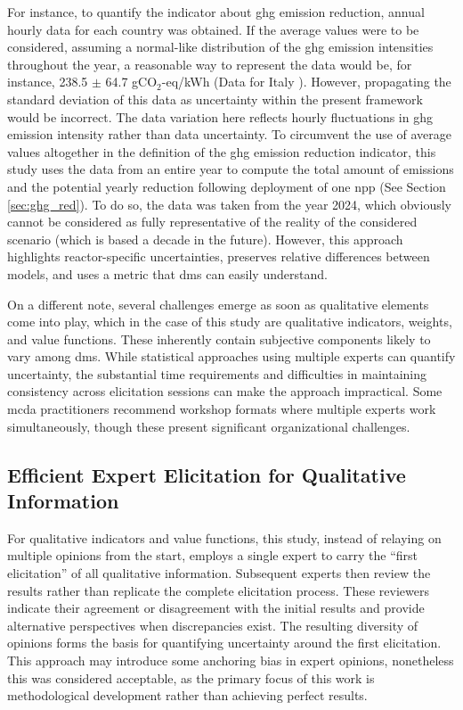 For instance, to quantify the indicator about \gls{ghg} emission reduction, annual hourly data for each country was obtained. If the average values were to be considered, assuming a normal-like distribution of the \gls{ghg} emission intensities throughout the year, a reasonable way to represent the data would be, for instance, 238.5 $\pm$ 64.7 gCO$_2$-eq/kWh (Data for Italy \cite{ElectricityMaps_CarbonIntensity_2024}). However, propagating the standard deviation of this data as uncertainty within the present framework would be incorrect. The data variation here reflects hourly fluctuations in \gls{ghg} emission intensity rather than data uncertainty. To circumvent the use of average values altogether in the definition of the \gls{ghg} emission reduction indicator, this study uses the data from an entire year to compute the total amount of emissions and the potential yearly reduction following deployment of one \gls{npp} (See Section \ref{sec:ghg_red}). To do so, the data was taken from the year 2024, which obviously cannot be considered as fully representative of the reality of the considered scenario (which is based a decade in the future). However, this approach highlights reactor-specific uncertainties, preserves relative differences between models, and uses a metric that \glspl{dm} can easily understand.

On a different note, several challenges emerge as soon as qualitative elements come into play, which in the case of this study are qualitative indicators, weights, and value functions. These inherently contain subjective components likely to vary among \glspl{dm}. While statistical approaches using multiple experts can quantify uncertainty, the substantial time requirements and difficulties in maintaining consistency across elicitation sessions can make the approach impractical. Some \gls{mcda} practitioners recommend workshop formats where multiple experts work simultaneously, though these present significant organizational challenges.

\subsection{Efficient Expert Elicitation for Qualitative Information}
\label{sec:qi}

For qualitative indicators and value functions, this study, instead of relaying on multiple opinions from the start, employs a single expert to carry the “first elicitation” of all qualitative information. Subsequent experts then review the results rather than replicate the complete elicitation process. These reviewers indicate their agreement or disagreement with the initial results and provide alternative perspectives when discrepancies exist. The resulting diversity of opinions forms the basis for quantifying uncertainty around the first elicitation. This approach may introduce some anchoring bias in expert opinions, nonetheless this was considered acceptable, as the primary focus of this work is methodological development rather than achieving perfect results.


